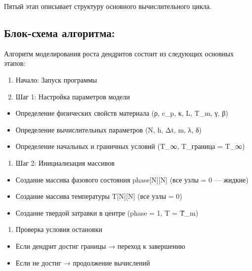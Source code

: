 \documentclass[
  12pt,
  a4paper,
  DIV=11,
  numbers=noendperiod]{scrreprt}
\providecommand{\tightlist}{%
  \setlength{\itemsep}{0pt}\setlength{\parskip}{0pt}}\usepackage{longtable,booktabs,array}
\begin{document}
Пятый этап описывает структуру основного вычислительного цикла.

\subsection{Блок-схема
алгоритма:}\label{ux431ux43bux43eux43a-ux441ux445ux435ux43cux430-ux430ux43bux433ux43eux440ux438ux442ux43cux430}

Алгоритм моделирования роста дендритов состоит из следующих основных
этапов:

\begin{enumerate}
\def\labelenumi{\arabic{enumi}.}
\item
  Начало: Запуск программы
\item
  Шаг 1: Настройка параметров модели
\end{enumerate}

\begin{itemize}
\tightlist
\item
  Определение физических свойств материала (ρ, c\_p, κ, L, T\_m, γ, β)
\item
  Определение вычислительных параметров (N, h, Δt, m, λ, δ)
\item
  Определение начальных и граничных условий (T\_∞, T\_граница = T\_∞)
\end{itemize}

\begin{enumerate}
\def\labelenumi{\arabic{enumi}.}
\setcounter{enumi}{2}
\tightlist
\item
  Шаг 2: Инициализация массивов
\end{enumerate}

\begin{itemize}
\tightlist
\item
  Создание массива фазового состояния phase{[}N{]}{[}N{]} (все узлы = 0
  --- жидкие)
\item
  Создание массива температуры T{[}N{]}{[}N{]} (все узлы = 0)
\item
  Создание твердой затравки в центре (phase = 1, T = T̃\_m)
\end{itemize}

\begin{enumerate}
\def\labelenumi{\arabic{enumi}.}
\setcounter{enumi}{3}
\tightlist
\item
  Проверка условия остановки
\end{enumerate}

\begin{itemize}
\tightlist
\item
  Если дендрит достиг границы → переход к завершению
\item
  Если не достиг → продолжение вычислений
\end{itemize}
\end{document}
